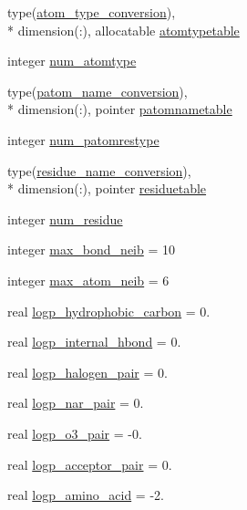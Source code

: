 \begin{DoxyCompactItemize}
type(\hyperlink{structcalc__xscore_1_1atom__type__conversion}{atom\-\_\-type\-\_\-conversion}), \\*
dimension(\-:), allocatable \hyperlink{classcalc__xscore_afb81db1780584d117536fdfbdc4fef7f}{atomtypetable}
\item 
integer \hyperlink{classcalc__xscore_adc4b3c5ced522a1b882b9af890dacbf9}{num\-\_\-atomtype}
\item 
type(\hyperlink{structcalc__xscore_1_1patom__name__conversion}{patom\-\_\-name\-\_\-conversion}), \\*
dimension(\-:), pointer \hyperlink{classcalc__xscore_a3366266413b9e1863715b562d6597fbd}{patomnametable}
\item 
integer \hyperlink{classcalc__xscore_a75c5e07f748c364d1cca2d3c7102f34f}{num\-\_\-patomrestype}
\item 
type(\hyperlink{structcalc__xscore_1_1residue__name__conversion}{residue\-\_\-name\-\_\-conversion}), \\*
dimension(\-:), pointer \hyperlink{classcalc__xscore_a62b1d7ae7994c42117aec60039e299c3}{residuetable}
\item 
integer \hyperlink{classcalc__xscore_a2d2ea6c3fafbca8b3d22793de798f4c6}{num\-\_\-residue}
\item 
integer \hyperlink{classcalc__xscore_ae0ac9278cce837911bc3af80f617f950}{max\-\_\-bond\-\_\-neib} = 10
\item 
integer \hyperlink{classcalc__xscore_a42e41b69ce6f72a9505878ace053991d}{max\-\_\-atom\-\_\-neib} = 6
\item 
real \hyperlink{classcalc__xscore_ab14312bf5c3dcc3c886028169b03996a}{logp\-\_\-hydrophobic\-\_\-carbon} = 0.
\item 
real \hyperlink{classcalc__xscore_abc42931dda7edcd8c88ac86abada0582}{logp\-\_\-internal\-\_\-hbond} = 0.
\item 
real \hyperlink{classcalc__xscore_a9c2ef721e4974450e49be0b2e5bbef01}{logp\-\_\-halogen\-\_\-pair} = 0.
\item 
real \hyperlink{classcalc__xscore_ac41000d70d0714d19503acad4d5e5d07}{logp\-\_\-nar\-\_\-pair} = 0.
\item 
real \hyperlink{classcalc__xscore_acdd9fd310f985b85ce23c3a6fcfcf1dd}{logp\-\_\-o3\-\_\-pair} = -\/0.
\item 
real \hyperlink{classcalc__xscore_adacad695c4d08392a2210054ce6f2f82}{logp\-\_\-acceptor\-\_\-pair} = 0.
\item 
real \hyperlink{classcalc__xscore_a484c6e7061a28ca2c8fb13eef56e75fd}{logp\-\_\-amino\-\_\-acid} = -\/2.

\end{DoxyCompactItemize}
